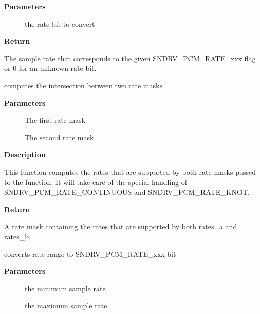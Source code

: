 \documentclass[a4paper,8pt,english]{sphinxmanual}
\begin{document}
\textbf{Parameters}
\begin{description}
\item[{}] \leavevmode
the rate bit to convert

\end{description}

\textbf{Return}

The sample rate that corresponds to the given SNDRV\_PCM\_RATE\_xxx flag
or 0 for an unknown rate bit.

\begin{fulllineitems}
\label{sound/kernel-api/alsa-driver-api:c.snd_pcm_rate_mask_intersect}
computes the intersection between two rate masks

\end{fulllineitems}


\textbf{Parameters}
\begin{description}
\item[{}] \leavevmode
The first rate mask

\item[{}] \leavevmode
The second rate mask

\end{description}

\textbf{Description}

This function computes the rates that are supported by both rate masks passed
to the function. It will take care of the special handling of
SNDRV\_PCM\_RATE\_CONTINUOUS and SNDRV\_PCM\_RATE\_KNOT.

\textbf{Return}

A rate mask containing the rates that are supported by both rates\_a
and rates\_b.

\begin{fulllineitems}
\label{sound/kernel-api/alsa-driver-api:c.snd_pcm_rate_range_to_bits}
converts rate range to SNDRV\_PCM\_RATE\_xxx bit

\end{fulllineitems}


\textbf{Parameters}
\begin{description}
\item[{}] \leavevmode
the minimum sample rate

\item[{}] \leavevmode
the maximum sample rate

\end{description}
\end{document}
